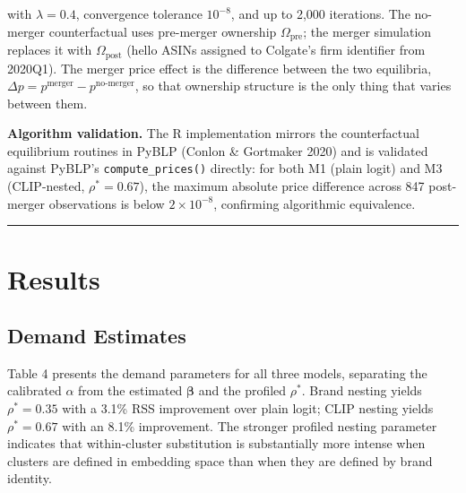 with \(\lambda = 0.4\), convergence tolerance \(10^{-8}\), and up to
2,000 iterations. The no-merger counterfactual uses pre-merger ownership
\(\Omega_{\text{pre}}\); the merger simulation replaces it with
\(\Omega_{\text{post}}\) (hello ASINs assigned to Colgate's firm
identifier from 2020Q1). The merger price effect is the difference
between the two equilibria,
\(\Delta p = p^{\text{merger}} - p^{\text{no-merger}}\), so that
ownership structure is the only thing that varies between them.

\textbf{Algorithm validation.} The R implementation mirrors the
counterfactual equilibrium routines in PyBLP (Conlon \& Gortmaker 2020)
and is validated against PyBLP's \texttt{compute\_prices()} directly:
for both M1 (plain logit) and M3 (CLIP-nested, \(\rho^*=0.67\)), the
maximum absolute price difference across 847 post-merger observations is
below \(2 \times 10^{-8}\), confirming algorithmic equivalence.

\begin{center}\rule{0.5\linewidth}{0.5pt}\end{center}

\chapter{Results}\label{results}

\section{Demand Estimates}\label{demand-estimates}

Table 4 presents the demand parameters for all three models, separating
the calibrated \(\alpha\) from the estimated \(\boldsymbol{\beta}\) and
the profiled \(\rho^{*}\). Brand nesting yields \(\rho^{*}=0.35\) with a
3.1\% RSS improvement over plain logit; CLIP nesting yields
\(\rho^{*}=0.67\) with an 8.1\% improvement. The stronger profiled
nesting parameter indicates that within-cluster substitution is
substantially more intense when clusters are defined in embedding space
than when they are defined by brand identity.

